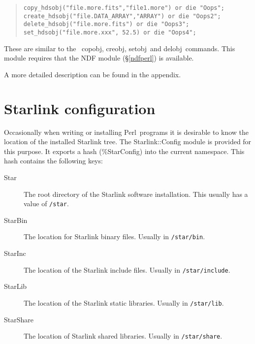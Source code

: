 \documentclass[twoside,11pt]{article}
\newenvironment{myquote}{\begin{quote}\begin{small}}{\end{small}\end{quote}}
\newcommand{\task}[1]{{\sf #1}}
\newcommand{\Figaro}{\xref{{\sc{Figaro}}}{sun86}{}}
\newcommand{\perl}{\xref{\textsf{Perl}}{sun193}{}}
\newcommand{\delobj}{\xref{\task{delobj}}{sun86}{DELOBJ}}
\newcommand{\creobj}{\xref{\task{creobj}}{sun86}{CREOBJ}}
\newcommand{\setobj}{\xref{\task{setobj}}{sun86}{SETOBJ}}
\newcommand{\copobj}{\xref{\task{copobj}}{sun86}{COPOBJ}}
\newcommand{\xref}[3]{#1}
\renewcommand{\_}{\texttt{\symbol{95}}}
\begin{document}
\begin{myquote}
\begin{verbatim}
copy_hdsobj("file.more.fits","file1.more") or die "Oops";
create_hdsobj("file.DATA_ARRAY","ARRAY") or die "Oops2";
delete_hdsobj("file.more.fits") or die "Oops3";
set_hdsobj("file.more.xxx", 52.5) or die "Oops4";
\end{verbatim}
\end{myquote}

These are similar to the \Figaro\ \copobj, \creobj, \setobj\ and \delobj\
commands.  This module requires that the NDF module (\S\ref{ndfperl}) is
available.

A more detailed description can be found in the appendix.

\section{Starlink configuration}

Occasionally when writing or installing \perl\ programs it is desirable to
know the location of the installed Starlink tree. The Starlink::Config module
is provided for this purpose. It exports a hash (\%StarConfig) into the
current namespace. This hash contains the following keys:

\begin{description}
\item[Star] \mbox{}

    The root directory of the Starlink software
    installation.  This usually has a value of \texttt{/star}.

\item[Star\_Bin] \mbox{}

    The location for Starlink binary files. Usually in
    \texttt{/star/bin}.

\item[Star\_Inc] \mbox{}

    The location of the Starlink include files. Usually in
    \texttt{/star/include}.

\item[Star\_Lib] \mbox{}

    The location of the Starlink static libraries. Usually
    in \texttt{/star/lib}.

\item[Star\_Share] \mbox{}
    The location of Starlink shared libraries. Usually in
    \texttt{/star/share}.

\end{description}
\end{document}
